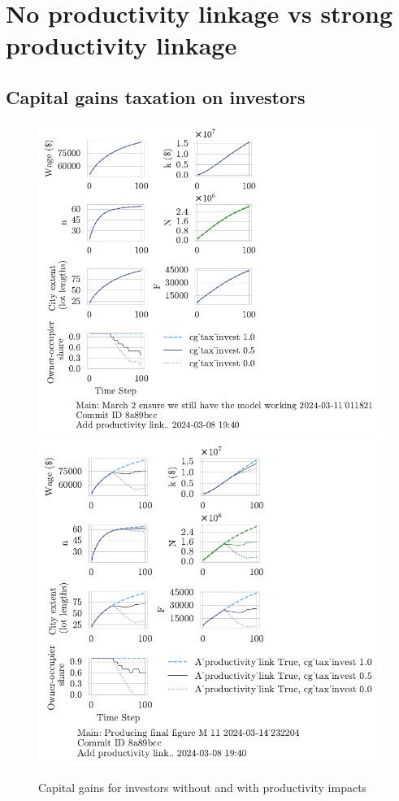 \newpage
\section{No productivity linkage vs strong productivity linkage }

\subsection{Capital gains taxation on investors}
\begin{figure}[h!tb] 
    \centering
    \includegraphics[scale=.75, trim={0 1.4cm 4.5cm 0},clip]{fig/cg_tax_invest-Main-011821.pdf} 
    \includegraphics[scale=.75, trim={0 1.4cm 3.7cm 0},clip]{fig/With-productivity_linkcg_tax_invest-232204.pdf} 
    \caption{Capital gains for investors without and with productivity impacts}
    \label{fig:CG-invest_link_W-WO-Cost-of-capital}
\end{figure}
